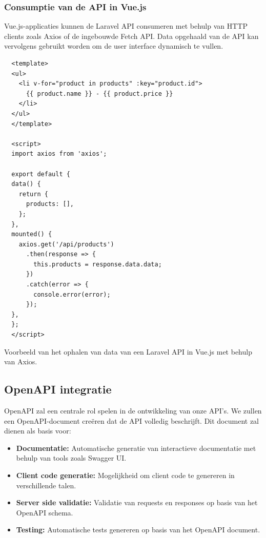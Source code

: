 \subsubsection{Consumptie van de API in Vue.js}

Vue.js-applicaties kunnen de Laravel API consumeren met behulp van HTTP clients zoals Axios of de ingebouwde Fetch API. Data opgehaald van de API kan vervolgens gebruikt worden om de user interface dynamisch te vullen.

\begin{listing}[H]
\begin{verbatim}
  <template>
  <ul>
    <li v-for="product in products" :key="product.id">
      {{ product.name }} - {{ product.price }}
    </li>
  </ul>
  </template>

  <script>
  import axios from 'axios';

  export default {
  data() {
    return {
      products: [],
    };
  },
  mounted() {
    axios.get('/api/products')
      .then(response => {
        this.products = response.data.data;
      })
      .catch(error => {
        console.error(error);
      });
  },
  };
  </script>
\end{verbatim}
\caption[Voorbeeld van het ophalen van data van een Laravel API in Vue.js]{Voorbeeld van het ophalen van data van een Laravel API in Vue.js met behulp van Axios.}
\label{lst:vue_axios}
\end{listing}

\subsection{OpenAPI integratie}

OpenAPI zal een centrale rol spelen in de ontwikkeling van onze API's. We zullen een OpenAPI-document creëren dat de API volledig beschrijft. Dit document zal dienen als basis voor:

\begin{itemize}
  \item \textbf{Documentatie:} Automatische generatie van interactieve documentatie met behulp van tools zoals Swagger UI.
  \item \textbf{Client code generatie:} Mogelijkheid om client code te genereren in verschillende talen.
  \item \textbf{Server side validatie:} Validatie van requests en responses op basis van het OpenAPI schema.
  \item \textbf{Testing:} Automatische tests genereren op basis van het OpenAPI document.
\end{itemize}

